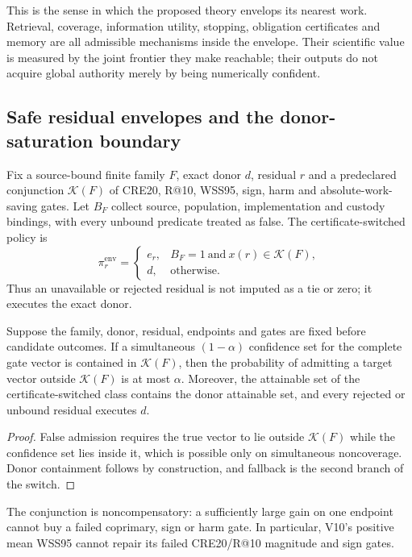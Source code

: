 This is the sense in which the proposed theory envelops its nearest work.
Retrieval, coverage, information utility, stopping, obligation certificates and
memory are all admissible mechanisms inside the envelope.  Their scientific
value is measured by the joint frontier they make reachable; their outputs do
not acquire global authority merely by being numerically confident.

\subsection{Safe residual envelopes and the donor-saturation boundary}

Fix a source-bound finite family $F$, exact donor $d$, residual $r$ and a
predeclared conjunction $\mathcal K(F)$ of CRE20, R@10, WSS95, sign, harm and
absolute-work-saving gates. Let $B_F$ collect source, population,
implementation and custody bindings, with every unbound predicate treated as
false. The certificate-switched policy is
\[
 \pi_r^{\mathrm{env}}=
 \begin{cases}
 e_r,&B_F=1\ \text{and}\ x(r)\in\mathcal K(F),\\
 d,&\text{otherwise}.
 \end{cases}
\]
Thus an unavailable or rejected residual is not imputed as a tie or zero; it
executes the exact donor.

\begin{theorem}
\label{thm:safe-residual-envelope}
Suppose the family, donor, residual, endpoints and gates are fixed before
candidate outcomes. If a simultaneous $(1-\alpha)$ confidence set for the
complete gate vector is contained in $\mathcal K(F)$, then the probability of
admitting a target vector outside $\mathcal K(F)$ is at most $\alpha$.
Moreover, the attainable set of the certificate-switched class contains the
donor attainable set, and every rejected or unbound residual executes $d$.
\end{theorem}

\begin{proof}
False admission requires the true vector to lie outside $\mathcal K(F)$ while
the confidence set lies inside it, which is possible only on simultaneous
noncoverage. Donor containment follows by construction, and fallback is the
second branch of the switch.
\end{proof}

The conjunction is noncompensatory: a sufficiently large gain on one endpoint
cannot buy a failed coprimary, sign or harm gate. In particular, V10's positive
mean WSS95 cannot repair its failed CRE20/R@10 magnitude and sign gates.

